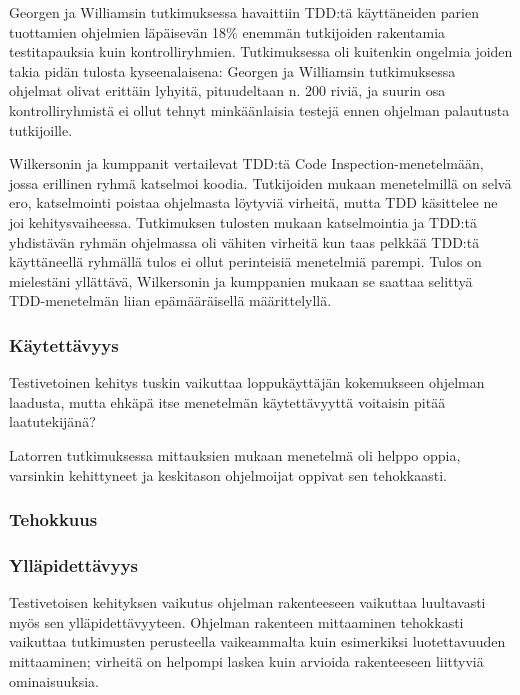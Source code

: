 \documentclass[finnish]{tktltiki2}
\theoremstyle{definition}
\theoremstyle{remark}
\begin{document}
Georgen ja Williamsin \cite{George04} tutkimuksessa havaittiin TDD:tä käyttäneiden parien tuottamien ohjelmien läpäisevän 18\% enemmän tutkijoiden rakentamia testitapauksia kuin kontrolliryhmien. Tutkimuksessa oli kuitenkin ongelmia joiden takia pidän tulosta kyseenalaisena: Georgen ja Williamsin tutkimuksessa ohjelmat olivat erittäin lyhyitä, pituudeltaan n. 200 riviä, ja suurin osa kontrolliryhmistä ei ollut tehnyt minkäänlaisia testejä ennen ohjelman palautusta tutkijoille.

Wilkersonin ja kumppanit \cite{Wilkerson12} vertailevat TDD:tä Code Inspection-menetelmään, jossa erillinen ryhmä katselmoi koodia. Tutkijoiden mukaan menetelmillä on selvä ero, katselmointi poistaa ohjelmasta löytyviä virheitä, mutta TDD käsittelee ne joi kehitysvaiheessa. Tutkimuksen tulosten mukaan katselmointia ja TDD:tä yhdistävän ryhmän ohjelmassa oli vähiten virheitä kun taas pelkkää TDD:tä käyttäneellä ryhmällä tulos ei ollut perinteisiä menetelmiä parempi. Tulos on mielestäni yllättävä, Wilkersonin ja kumppanien mukaan se saattaa selittyä TDD-menetelmän liian epämääräisellä määrittelyllä.



\subsubsection{Käytettävyys}

Testivetoinen kehitys tuskin vaikuttaa loppukäyttäjän kokemukseen ohjelman laadusta, mutta ehkäpä itse menetelmän käytettävyyttä voitaisin pitää laatutekijänä? 

Latorren \cite{Latorre14} tutkimuksessa mittauksien mukaan menetelmä oli helppo oppia, varsinkin kehittyneet ja keskitason ohjelmoijat oppivat sen tehokkaasti.

\subsubsection{Tehokkuus}

\subsubsection{Ylläpidettävyys}

Testivetoisen kehityksen vaikutus ohjelman rakenteeseen vaikuttaa luultavasti myös sen ylläpidettävyyteen. Ohjelman rakenteen mittaaminen tehokkasti vaikuttaa tutkimusten perusteella vaikeammalta kuin esimerkiksi luotettavuuden mittaaminen; virheitä on helpompi laskea kuin arvioida rakenteeseen liittyviä ominaisuuksia.
\end{document}
